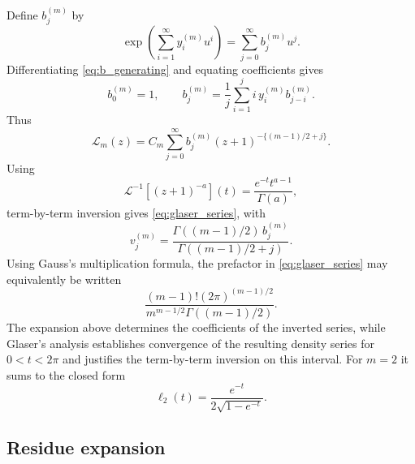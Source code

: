 \documentclass[11pt]{article}
\theoremstyle{remark}
\begin{document}
Define $b_j^{(m)}$ by
\begin{equation}
 \exp\left(\sum_{i=1}^{\infty}y_i^{(m)}u^i\right)
 =\sum_{j=0}^{\infty}b_j^{(m)}u^j.
 \label{eq:b_generating}
\end{equation}
Differentiating \eqref{eq:b_generating} and equating coefficients gives
\begin{equation}
 b_0^{(m)}=1,
 \qquad
 b_j^{(m)}=\frac1j\sum_{i=1}^j
 i\,y_i^{(m)}b_{j-i}^{(m)}.
 \label{eq:b_recurrence}
\end{equation}
Thus
\begin{equation}
 \mathcal L_m(z)
 =C_m\sum_{j=0}^{\infty}b_j^{(m)}(z+1)^{-\{(m-1)/2+j\}}.
 \label{eq:L_power}
\end{equation}
Using
\begin{equation}
 \mathcal L^{-1}[(z+1)^{-a}](t)
 =\frac{e^{-t}t^{a-1}}{\Gamma(a)},
 \label{eq:inverse_basic}
\end{equation}
term-by-term inversion gives \eqref{eq:glaser_series}, with
\begin{equation}
 v_j^{(m)}=
 \frac{\Gamma((m-1)/2)\,b_j^{(m)}}
   {\Gamma((m-1)/2+j)}.
 \label{eq:v_coeff}
\end{equation}
Using Gauss's multiplication formula, the prefactor in \eqref{eq:glaser_series} may equivalently be written
\[
 \frac{(m-1)!(2\pi)^{(m-1)/2}}
 {m^{m-1/2}\Gamma((m-1)/2)}.
\]
The expansion above determines the coefficients of the inverted series, while Glaser's analysis establishes convergence of the resulting density series for $0<t<2\pi$ and justifies the term-by-term inversion on this interval. For $m=2$ it sums to the closed form
\begin{equation}
 \ell_2(t)=\frac{e^{-t}}{2\sqrt{1-e^{-t}}}.
 \label{eq:ell2}
\end{equation}

\subsection{Residue expansion}
\end{document}
